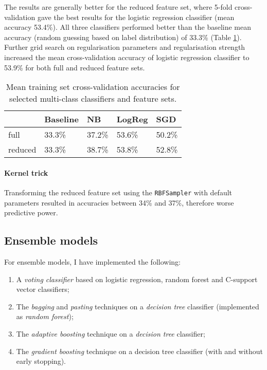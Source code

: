 \documentclass[10pt, twocolumn]{article}
\begin{document}
The results are generally better for the reduced feature set, where 5-fold cross-validation gave the best results for the logistic regression classifier (mean accuracy 53.4\%). All three classifiers performed better than the baseline mean accuracy (random guessing based on label distribution) of 33.3\% (Table \ref{multiclass}). Further grid search on regularisation parameters and regularisation strength increased the mean cross-validation accuracy of logistic regression classifier to 53.9\% for both full and reduced feature sets.

\begin{table}[]
	\begin{tabularx}{\linewidth}{XXXXX}
		\hline
								 & \textbf{Baseline} & \textbf{NB} & \textbf{LogReg} & \textbf{SGD} \\ \hline
		full   & 33.3\%            & 37.2\%      & 53.6\%          & 50.2\%       \\
		reduced & 33.3\%            & 38.7\%      & 53.8\%          & 52.8\%       \\ \hline
		\end{tabularx}
\caption{Mean training set cross-validation accuracies for selected multi-class classifiers and feature sets.}\label{multiclass}
\end{table}

\paragraph{Kernel trick} Transforming the reduced feature set using the \texttt{RBFSampler} with default parameters resulted in accuracies between 34\% and 37\%, therefore worse predictive power.

\subsection{Ensemble models}
For ensemble models, I have implemented the following: 
\begin{enumerate}[label=(\textit{\roman*})]
	\item A \textit{voting classifier} based on logistic regression, random forest and C-support vector classifiers;
	\item The \textit{bagging} and \textit{pasting} techniques on a \textit{decision tree} classifier (implemented as \textit{random forest});
	\item The \textit{adaptive boosting} technique on a \textit{decision tree} classifier;
	\item The \textit{gradient boosting} technique on a decision tree classifier (with and without early stopping).
\end{enumerate}
\end{document}
